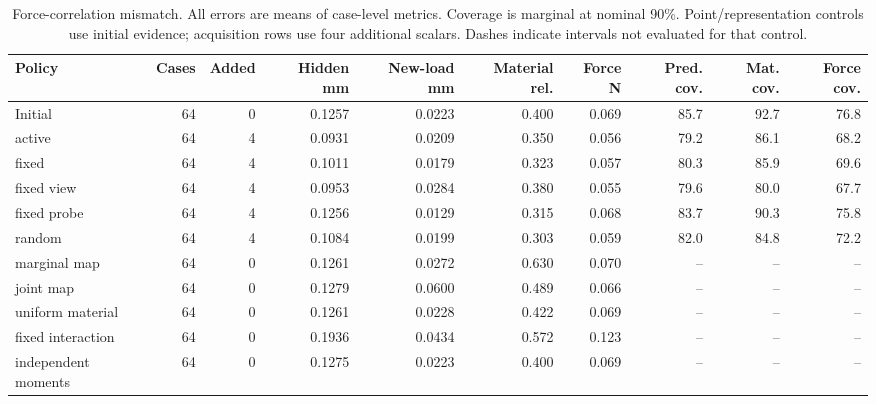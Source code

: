 \begin{table}[!t]\centering\small\setlength{\tabcolsep}{4pt}
\caption{Force-correlation mismatch. All errors are means of case-level metrics. Coverage is marginal at nominal 90\%. Point/representation controls use initial evidence; acquisition rows use four additional scalars. Dashes indicate intervals not evaluated for that control.}
\begin{tabular}{lrrrrrrrrr}\toprule
Policy & Cases & Added & Hidden mm & New-load mm & Material rel. & Force N & Pred. cov. & Mat. cov. & Force cov.\\\midrule
Initial & 64 & 0 & 0.1257 & 0.0223 & 0.400 & 0.069 & 85.7 & 92.7 & 76.8\\
active & 64 & 4 & 0.0931 & 0.0209 & 0.350 & 0.056 & 79.2 & 86.1 & 68.2\\
fixed & 64 & 4 & 0.1011 & 0.0179 & 0.323 & 0.057 & 80.3 & 85.9 & 69.6\\
fixed view & 64 & 4 & 0.0953 & 0.0284 & 0.380 & 0.055 & 79.6 & 80.0 & 67.7\\
fixed probe & 64 & 4 & 0.1256 & 0.0129 & 0.315 & 0.068 & 83.7 & 90.3 & 75.8\\
random & 64 & 4 & 0.1084 & 0.0199 & 0.303 & 0.059 & 82.0 & 84.8 & 72.2\\
marginal map & 64 & 0 & 0.1261 & 0.0272 & 0.630 & 0.070 & -- & -- & --\\
joint map & 64 & 0 & 0.1279 & 0.0600 & 0.489 & 0.066 & -- & -- & --\\
uniform material & 64 & 0 & 0.1261 & 0.0228 & 0.422 & 0.069 & -- & -- & --\\
fixed interaction & 64 & 0 & 0.1936 & 0.0434 & 0.572 & 0.123 & -- & -- & --\\
independent moments & 64 & 0 & 0.1275 & 0.0223 & 0.400 & 0.069 & -- & -- & --\\
\bottomrule\end{tabular}
\end{table}

